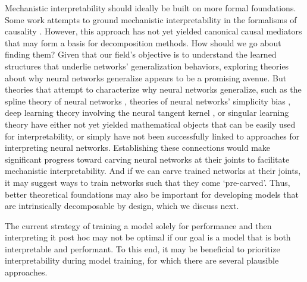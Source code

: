 Mechanistic interpretability should ideally be built on more formal foundations. Some work attempts to ground mechanistic interpretability in the formalisms of causality \citep{Geiger_2023_CausalAbstractionRepresentationSubspace}. However, this approach has not yet yielded canonical causal mediators \citep{mueller2024questrightmediatorhistory} that may form a basis for decomposition methods. How should we go about finding them? Given that our field's objective is to understand the learned structures that underlie networks' generalization behaviors, exploring theories about why neural networks generalize appears to be a promising avenue. But theories that attempt to characterize why neural networks generalize, such as the spline theory of neural networks \citep{balestriero_2018_spline}, theories of neural networks' simplicity bias \citep{vallepérez2019deeplearninggeneralizesparameterfunction}, deep learning theory involving the neural tangent kernel \citep{jacot2020neuraltangentkernelconvergence,Roberts_2022_principles}, or singular learning theory \citep{Watanabe_2009, Wei_2023_deeplearningsingular} have either not yet yielded mathematical objects that can be easily used for interpretability, or simply have not been successfully linked to approaches for interpreting neural networks. Establishing these connections would make significant progress toward carving neural networks at their joints to facilitate mechanistic interpretability. And if we can carve trained networks at their joints, it may suggest ways to train networks such that they come `pre-carved'. Thus, better theoretical foundations may also be important for developing models that are intrinsically decomposable by design, which we discuss next.

\label{par:intrinsic-interpretability}

The current strategy of training a model solely for performance and then interpreting it post hoc may not be optimal if our goal is a model that is both interpretable and performant. To this end, it may be beneficial to prioritize interpretability during model training, for which there are several plausible approaches. 


